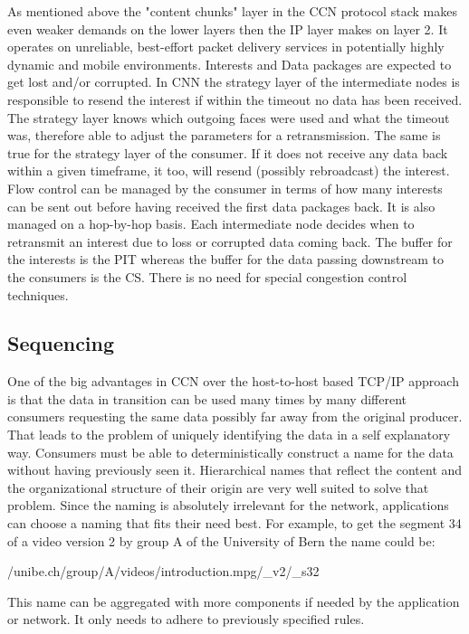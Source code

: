 As mentioned above the "content chunks" layer in the CCN protocol stack makes even weaker demands on the lower layers then the IP layer makes on layer 2. It operates on unreliable, best-effort packet delivery services in potentially highly dynamic and mobile environments. Interests and Data packages are expected to get lost and/or corrupted. In CNN the strategy layer of the intermediate nodes is responsible to resend the interest if within the timeout no data has been received. The strategy layer knows which outgoing faces were used and what the timeout was, therefore able to adjust the parameters for a retransmission. The same is true for the strategy layer of the consumer. If it does not receive any data back within a given timeframe, it too, will resend (possibly rebroadcast) the interest.
\\
Flow control can be managed by the consumer in terms of how many interests can be sent out before having received the first data packages back. It is also managed on a hop-by-hop basis. Each intermediate node decides when to retransmit an interest due to loss or corrupted data coming back. The buffer for the interests is the PIT whereas the buffer for the data passing downstream to the consumers is the CS. There is no need for special congestion control techniques.

\subsection{Sequencing}

One of the big advantages in CCN over the host-to-host based TCP/IP approach is that the data in transition can be used many times by many different consumers requesting the same data possibly far away from the original producer. That leads to the problem of uniquely identifying the data in a self explanatory way. Consumers must be able to deterministically construct a name for the data without having previously seen it. Hierarchical names that reflect the content and the organizational structure of their origin are very well suited to solve that problem. Since the naming is absolutely irrelevant for the network, applications can choose a naming that fits their need best. For example, to get the segment 34 of a video version 2 by group A of the University of Bern the name could be:

/unibe.ch/group/A/videos/introduction.mpg/_v2/_s32

This name can be aggregated with more components if needed by the application or network. It only needs to adhere to previously specified rules.

